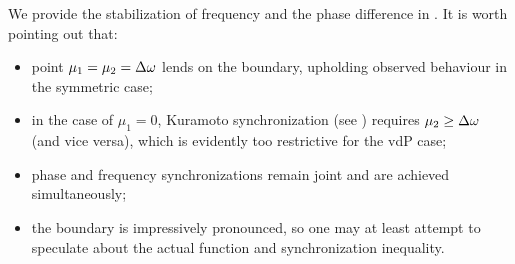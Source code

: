 \documentclass{mynotes}
\begin{document}
We provide the stabilization of frequency and the phase difference in . It is worth pointing out that:
\begin{itemize}[ topsep = -0.5em, itemsep = -0.25em ]
      \item point \( \mu_1 = \mu_2 = \Delta\omega \) lends on the boundary, upholding observed behaviour in the symmetric case;
      \item in the case of \( \mu_1 = 0 \), Kuramoto synchronization (see ) requires \( \mu_2 \ge \Delta\omega \) (and vice versa), which is evidently too restrictive for the vdP case;
      \item phase and frequency synchronizations remain joint and are achieved simultaneously;
      \item the boundary is impressively pronounced, so one may at least attempt to speculate about the actual function and synchronization inequality.
\end{itemize}










\clearpage
\nocite{*}


\end{document}
